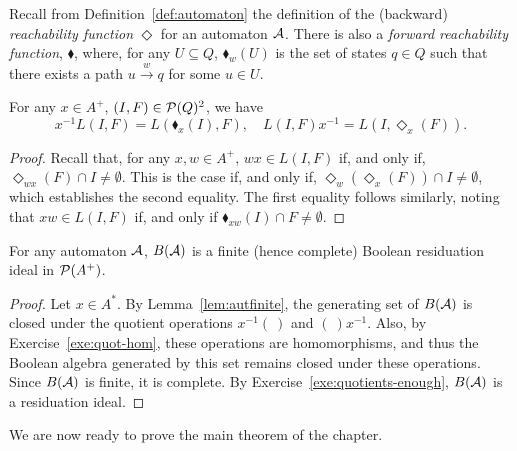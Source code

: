 Recall from Definition~\ref{def:automaton} the definition of the (backward) \emph{reachability function} $\Diamond$ for an automaton $\mathcal{A}$. There is also a \emph{forward reachability function}, $\blacklozenge$, where, for any $U \subseteq Q$,  $\blacklozenge_w(U)$ is the set of states $q \in Q$ such that there exists a path $u \stackrel{w}{\to} q$ for some $u \in U$.
\begin{lemma}\label{lem:autfinite}
For any $x \in A^+$, $(I,F) \in \mathcal{P}(Q)^2$, we have
\[ x^{-1} L(I,F) = L(\blacklozenge_x(I), F), \quad L(I,F)x^{-1} = L(I, \Diamond_x(F)).\]
\end{lemma}
\begin{proof}
  Recall that, for any $x, w \in A^+$, $wx \in L(I,F)$ if, and only if, $\Diamond_{wx}(F) \cap I \neq \emptyset$. This is the case if, and only if, $\Diamond_w(\Diamond_x(F)) \cap I \neq \emptyset$, which establishes the second equality. The first equality follows similarly, noting that $xw \in L(I,F)$ if, and only if $\blacklozenge_{xw}(I) \cap F \neq \emptyset$.
\end{proof}


\begin{proposition}\label{prop:residuationideal}
For any automaton $\mathcal{A}$, $B(\mathcal{A})$ is a finite (hence complete) Boolean residuation ideal in $\mathcal{P}(A^+)$. %
\end{proposition}
\begin{proof}
Let $x\in A^*$. By Lemma~\ref{lem:autfinite}, the generating set of $B(\mathcal{A})$ is closed under the quotient operations $x^{-1}(\ )$ and $(\ )x^{-1} $. Also, by Exercise~\ref{exe:quot-hom}, these operations are homomorphisms, and thus the Boolean algebra generated by this set remains closed under these operations. Since $B(\mathcal{A})$ is finite, it is complete. By Exercise~\ref{exe:quotients-enough}, $B(\mathcal{A})$ is a residuation ideal.
\end{proof}
%
We are now ready to prove the main theorem of the chapter.



